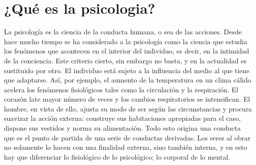 \section{¿Qué es la psicologia?}

La psicología es la ciencia de la conducta humana, o sea de las acciones.
Desde hace mucho tiempo se ha considerado a la psicología como la ciencia que estudia
los fenómenos que acontecen en el interior del individuo, es decir, en la intimidad de la
conciencia. Este criterio cierto, sin embargo no basta, y en la actualidad es sustituido
por otro. El individuo está sujeto a la influencia del medio al que tiene que adaptarse.
Así, por ejemplo, el aumento de la temperatura en un clima cálido acelera los
fenómenos fisiológicos tales como la circulación y la respiración. El corazón late mayor
número de veces y los cambios respiratorios se intensifican. El hombre, en vista de ello,
ajusta su modo de ser según las circunstancias y procura suavizar la acción externa:
construye sus habitaciones apropiadas para el caso, dispone sus vestidos y norma su
alimentación. Todo esto origina una conducta que es el punto de partida de una serie de
conductas derivadas. Los seres al obrar no solamente lo hacen con una finalidad
externa, sino también interna, y en esto hay que diferenciar lo fisiológico de lo
psicológico; lo corporal de lo mental. \cite{psicologia}